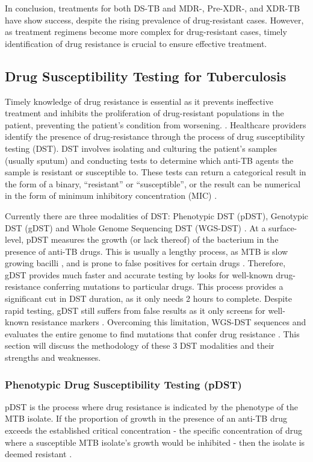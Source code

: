 In conclusion, treatments for both DS-TB and MDR-, Pre-XDR-, and XDR-TB have show success, despite the rising prevalence of drug-resistant cases. However, as treatment regimens become more complex for drug-resistant cases, timely identification of drug resistance is crucial to ensure effective treatment. 

\subsection{Drug Susceptibility Testing for Tuberculosis}
Timely knowledge of drug resistance is essential as it prevents ineffective treatment and inhibits the proliferation of drug-resistant populations in the patient, preventing the patient's condition from worsening. \cite{whitney2016}. Healthcare providers identify the presence of drug-resistance through the process of drug susceptibility testing (DST). DST involves isolating and culturing the patient's samples (usually sputum) and conducting tests to determine which anti-TB agents the sample is resistant or susceptible to. These tests can return a categorical result in the form of a binary, \enquote{resistant} or \enquote{susceptible}, or the result can be numerical in the form of minimum inhibitory concentration (MIC) \cite{whitney2016, islam2017drug}. 

Currently there are three modalities of DST: Phenotypic DST (pDST), Genotypic DST (gDST) and Whole Genome Sequencing DST (WGS-DST) \cite{who2022}. At a surface-level, pDST measures the growth (or lack thereof) of the bacterium in the presence of anti-TB drugs. This is usually a lengthy process, as MTB is slow growing bacilli \cite{gagneux2018}, and is prone to false positives for certain drugs \cite{Yusoof2022}. Therefore, gDST provides much faster and accurate testing by looks for well-known drug-resistance conferring mutations to particular drugs. This process provides a significant cut in DST duration, as it only needs 2 hours to complete.
Despite rapid testing, gDST still suffers from false results as it only screens for well-known resistance markers \cite{whitney2016}. Overcoming this limitation, WGS-DST sequences and evaluates the entire genome to find mutations that confer drug resistance \cite{whitney2016}. This section will discuss the methodology of these 3 DST modalities and their strengths and weaknesses.

\subsubsection{Phenotypic Drug Susceptibility Testing (pDST)}
pDST is the process where drug resistance is indicated by the phenotype of the MTB isolate. If the proportion of growth in the presence of an anti-TB drug exceeds the established critical concentration - the specific concentration of drug where a susceptible MTB isolate's growth would be inhibited - then the isolate is deemed resistant \cite{who2022, who2021tb}. 

